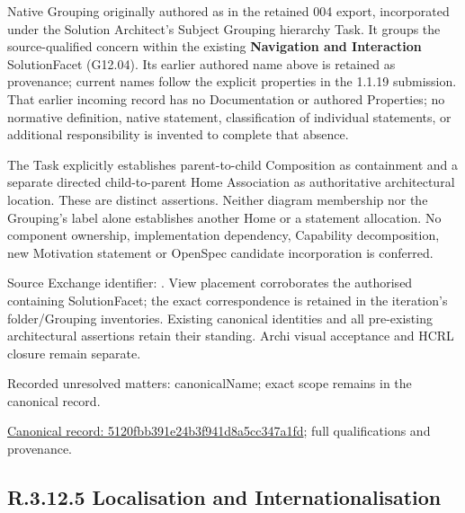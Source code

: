 Native Grouping originally authored as \texttt{} in the retained 004 export,
incorporated under the Solution Architect's Subject Grouping hierarchy Task.
It groups the source-qualified \texttt{} concern within
the existing \textbf{Navigation and Interaction} SolutionFacet (G12.04). Its earlier authored name above is retained as provenance; current names
follow the explicit properties in the 1.1.19 submission.
That earlier incoming record has no Documentation or authored Properties; no normative
definition, native statement, classification of individual statements, or
additional responsibility is invented to complete that absence.



The Task explicitly establishes parent-to-child Composition as containment and
a separate directed child-to-parent Home Association as authoritative architectural
location. These are distinct assertions. Neither diagram membership nor the
Grouping's label alone establishes another Home or a statement allocation.
No component ownership, implementation dependency, Capability decomposition,
new Motivation statement or OpenSpec candidate incorporation is conferred.



Source Exchange identifier: \texttt{}. View placement corroborates
the authorised containing SolutionFacet; the exact correspondence is retained in the
iteration's folder/Grouping inventories. Existing canonical identities and all
pre-existing architectural assertions retain their standing. Archi visual
acceptance and HCRL closure remain separate.


{\small Recorded unresolved matters: canonicalName; exact scope remains in the canonical record.}\par
{\footnotesize \href{../../../../../../../continuum/grouping/5120fbb391e24b3f941d8a5cc347a1fd.md}{Canonical record: 5120fbb391e24b3f941d8a5cc347a1fd}; full qualifications and provenance.}\par
\subsection*{R.3.12.5 Localisation and Internationalisation}
\label{navigation:R.3.12.5}

